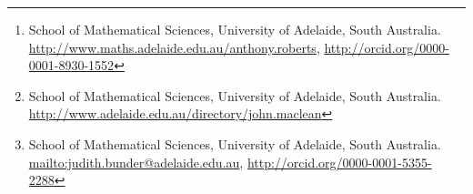 


\author{A.~J.~Roberts\thanks{%
School of Mathematical Sciences, University of Adelaide, South Australia.
\url{http://www.maths.adelaide.edu.au/anthony.roberts},
\url{http://orcid.org/0000-0001-8930-1552}}
\and John~Maclean\thanks{%
School of Mathematical Sciences, University of Adelaide, South Australia.
\url{http://www.adelaide.edu.au/directory/john.maclean}}
\and J.~E.~Bunder\thanks{%
School of Mathematical Sciences, University of Adelaide, South Australia.
\protect\url{mailto:judith.bunder@adelaide.edu.au},
\protect\url{http://orcid.org/0000-0001-5355-2288}}
}

\date{\today}

\renewcommand{\and}{\hspace{2em plus 1em minus 1em}}


\usepackage[T1]{fontenc}
\usepackage[dvipsnames]{xcolor}


\usepackage{pgfplots} 
\pgfplotsset{compat=newest} %
\usetikzlibrary{decorations.markings}
\usetikzlibrary{shapes,arrows,fit}
\usetikzlibrary{positioning}

\def\figurename{\em Figure}

\usepackage{fancyvrb}
\newenvironment{matlab}%
    {\Verbatim[numbers=left,firstnumber=\the\inputlineno]}%
    {\endVerbatim}
\makeatletter
\def\fancyvrbStartStop{%
  \edef\FancyVerbStartString{\@percentchar\@charrb} 
  \edef\FancyVerbStopString{\@percentchar\@charlb} }
\makeatother


\usepackage{natbib}

\AtBeginDocument{\let\harvardurl\url}

\usepackage{versions}
\newenvironment{devMan}{}{} %
\newenvironment{userMan}{}{} %


\usepackage{url,microtype,amsmath,amssymb,defns,graphicx,hyperref,doi}
\hypersetup{colorlinks,linkcolor=RoyalBlue,citecolor=RoyalBlue,pagecolor=RoyalBlue,%
            urlcolor=magenta,filecolor=magenta,breaklinks,%
            dvips,bookmarks,bookmarksopen}
\makeatletter
\AtBeginDocument{{\def\and{, }\def\thanks#1{}%
  \hypersetup{
    pdfauthor={\@author},
    pdftitle={\@title}}}
    }
\makeatother
\usepackage[capitalise,nameinlink,noabbrev]{cleveref}

